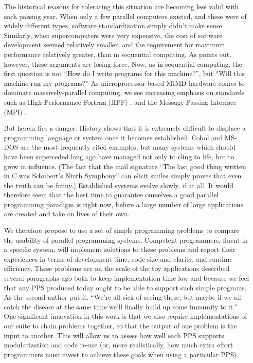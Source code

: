 The historical reasons for tolerating this situation are becoming less valid with each passing year.
When only a few parallel computers existed,
and these were of widely different types,
software standardization simply didn't make sense.
Similarly,
when supercomputers were very expensive,
the cost of software development seemed relatively smaller,
and the requirement for maximum performance relatively greater,
than in sequential computing.
As \cite{b:social-limits-speed} points out,
however, these arguments are losing force.
Now,
as in sequential computing,
the first question is not ``How do I write programs for this machine?'',
but ``Will this machine run my programs?''
As microprocessor-based MIMD hardware comes to dominate massively-parallel computing,
we see increasing emphasis on standards such as High-Performance Fortran (HPF) \cite{b:hpf-overview},
and the Message-Passing Interface (MPI) \cite{b:mpi-overview}.

But herein lies a danger.
History shows that it is extremely difficult
to displace a programming language or system once it becomes established.
Cobol and MS-DOS are the most frequently cited examples,
but many systems which should have been superceded long ago have managed
not only to cling to life,
but to grow in influence.
(The fact that the mail signature
``The last good thing written in C was Schubert's Ninth Symphony''
can elicit smiles simply proves that even the truth can be funny.)
Established systems evolve slowly, if at all.
It would therefore seem that the best time to guarantee ourselves
a good parallel programming paradigm is right now,
before a large number of large applications are created and take on lives of their own.

We therefore propose to use a set of simple programming problems to compare
the usability of parallel programming systems.
Competent programmers, fluent in a specific system,
will implement solutions to these problems and report their experiences
in terms of development time, code size and clarity, and runtime efficiency.
These problems are on the scale of the toy applications described several paragraphs ago
both to keep implementation time low
and because we feel that any PPS produced today ought to be able to support such simple programs.
As the second author put it,
``We're all sick of seeing these,
but maybe if we all catch the disease at the same time we'll finally build up some immunity to it.''
One significant innovation in this work is that
we also require implementations of our suite to chain problems together,
so that the output of one problem is the input to another.
This will allow us to assess how well each PPS supports modularization and code re-use
(or, more realistically, how much extra effort programmers must invest
to achieve these goals when using a particular PPS).

